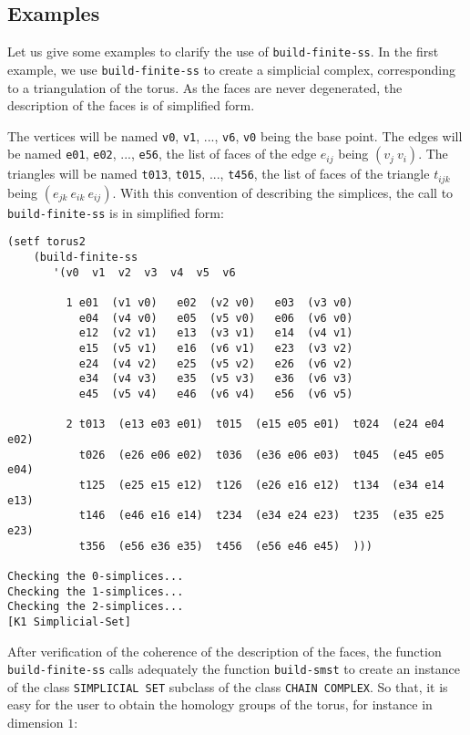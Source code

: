 \subsection* {Examples}
Let us give some examples to clarify the use of {\tt build-finite-ss}. In the first example,
we use  {\tt build-finite-ss} to create a simplicial complex, cor\-res\-pon\-ding to a
triangulation of the torus. As the faces are never degenerated, the description of the faces
is of simplified form.
%
\vskip 0.40cm
\centerline{}
\vskip 0.40cm
%
The vertices will be named {\tt v0}, {\tt v1}, ..., {\tt v6}, {\tt v0} being the base point. The edges
will be named {\tt e01}, {\tt e02}, ...,  {\tt e56}, the list of faces of the edge $e_{ij}$ being
$(v_j\  v_i)$. The triangles will be named {\tt t013}, {\tt t015}, ..., {\tt t456}, the list of faces of
the triangle $t_{ijk}$ being $(e_{jk}\  e_{ik}\  e_{ij})$.
With this convention of describing the simplices, the call to {\tt build-finite-ss} is in simplified form:
{\footnotesize\begin{verbatim}
(setf torus2
    (build-finite-ss 
       '(v0  v1  v2  v3  v4  v5  v6 

         1 e01  (v1 v0)   e02  (v2 v0)   e03  (v3 v0)
           e04  (v4 v0)   e05  (v5 v0)   e06  (v6 v0)
           e12  (v2 v1)   e13  (v3 v1)   e14  (v4 v1)
           e15  (v5 v1)   e16  (v6 v1)   e23  (v3 v2)
           e24  (v4 v2)   e25  (v5 v2)   e26  (v6 v2)
           e34  (v4 v3)   e35  (v5 v3)   e36  (v6 v3)
           e45  (v5 v4)   e46  (v6 v4)   e56  (v6 v5)

         2 t013  (e13 e03 e01)  t015  (e15 e05 e01)  t024  (e24 e04 e02)
           t026  (e26 e06 e02)  t036  (e36 e06 e03)  t045  (e45 e05 e04)
           t125  (e25 e15 e12)  t126  (e26 e16 e12)  t134  (e34 e14 e13)
           t146  (e46 e16 e14)  t234  (e34 e24 e23)  t235  (e35 e25 e23)
           t356  (e56 e36 e35)  t456  (e56 e46 e45)  )))

Checking the 0-simplices...
Checking the 1-simplices...
Checking the 2-simplices...
[K1 Simplicial-Set]
\end{verbatim}}
After verification of the coherence of the description of the faces, the function
{\tt build-finite-ss} calls adequately the function {\tt build-smst} to create an instance
of the class {\tt SIMPLICIAL SET} subclass of the class {\tt CHAIN COMPLEX}. So that, it is easy for 
the user  to obtain the homology groups of the torus, for instance in dimension $1$:

